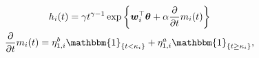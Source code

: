 \begin{gather}
  h_{i}(t) =
    \gamma t^{\gamma - 1} \exp\left\{
      \boldsymbol{w}_{i}^{\top}\boldsymbol{\theta} + \alpha \frac{\partial}{\partial t} m_{i}(t)
    \right\} \label{eqn:surv-submodel-def-one}\\
  \frac{\partial}{\partial t} m_{i}(t) =
    \eta^{b}_{1, i} \mathbbm{1}_{\{t < \kappa_{i}\}} +
    \eta^{a}_{1, i} \mathbbm{1}_{\{t \geq \kappa_{i}\}}, \label{eqn:surv-submodel-def-two}
\end{gather}